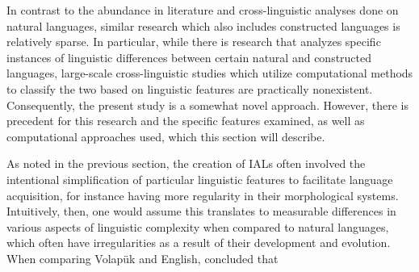 \documentclass[12pt,a4paper]{article}
\numberwithin{figure}{section}
\numberwithin{table}{section}
\numberwithin{definition}{section}
\begin{document}


In contrast to the abundance in literature and cross-linguistic analyses done on natural languages, similar research which also includes constructed languages is relatively sparse. In particular, while there is research that analyzes specific instances of linguistic differences between certain natural and constructed languages, large-scale cross-linguistic studies which utilize computational methods to classify the two based on linguistic features are practically nonexistent. Consequently, the present study is a somewhat novel approach. However, there is precedent for this research and the specific features examined, as well as computational approaches used, which this section will describe.

As noted in the previous section, the creation of IALs often involved the intentional simplification of particular linguistic features to facilitate language acquisition, for instance having more regularity in their morphological systems. Intuitively, then, one would assume this translates to measurable differences in various aspects of linguistic complexity when compared to natural languages, which often have irregularities as a result of their development and evolution. When comparing Volapük and English, \textcite{Gobbo2016article} concluded that
\end{document}
